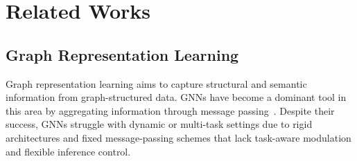 \section{Related Works}
\label{sec:related_work}
\subsection{Graph Representation Learning}
Graph representation learning aims to capture structural and semantic information from graph-structured data. GNNs have become a dominant tool in this area by aggregating information through message passing~\cite{cai2018comp,liu2021pick,DBLP:conf/nips/BodnarFOWLMB21,bodnar2021weisfeiler}. Despite their success, GNNs struggle with dynamic or multi-task settings due to rigid architectures and fixed message-passing schemes that lack task-aware modulation and flexible inference control.%

